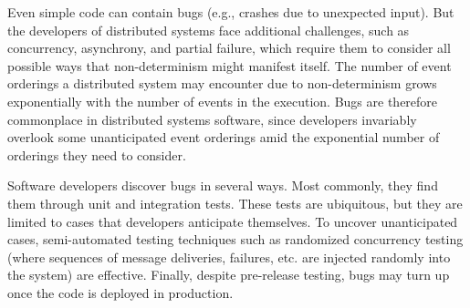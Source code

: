 
Even simple code can contain bugs (e.g., crashes due to unexpected input). But the developers
of distributed systems face
additional challenges, such as concurrency, asynchrony, and partial failure, which require them to
consider all possible ways that non-determinism might manifest itself.
The number of event orderings %
a distributed system may encounter due to non-determinism grows exponentially with the number of
events in the execution. Bugs are therefore commonplace in distributed systems software, since developers invariably
overlook some unanticipated event orderings amid the exponential number of
orderings they need to consider.




Software developers discover bugs in several ways.
Most commonly, they find them through unit and integration tests. These tests are ubiquitous, but they are limited to cases that developers
anticipate themselves. To uncover unanticipated cases, semi-automated testing
techniques such as randomized concurrency testing (where
sequences of message deliveries, failures, etc. are injected randomly into the system) are effective.
Finally, despite pre-release testing, bugs may turn up once the code is deployed in production.

